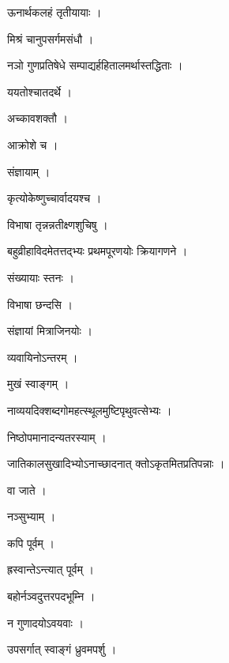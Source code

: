 \documentclass[10pt, openany]{book}
\begin{document}
\noindent ऊनार्थकलहं तृतीयायाः ।

\noindent मिश्रं चानुपसर्गमसंधौ ।

\noindent नञो गुणप्रतिषेधे सम्पाद्यर्हहितालमर्थास्तद्धिताः ।

\noindent ययतोश्चातदर्थे ।

\noindent अच्कावशक्तौ ।

\noindent आक्रोशे च ।

\noindent संज्ञायाम् ।

\noindent कृत्योकेष्णुच्चार्वादयश्च ।

\noindent विभाषा तृन्नन्नतीक्ष्णशुचिषु ।

\noindent बहुव्रीहाविदमेतत्तद्भ्यः प्रथमपूरणयोः क्रियागणने ।

\noindent संख्यायाः स्तनः ।

\noindent विभाषा छन्दसि ।

\noindent संज्ञायां मित्राजिनयोः ।

\noindent व्यवायिनोऽन्तरम् ।

\noindent मुखं स्वाङ्गम् ।

\noindent नाव्ययदिक्शब्दगोमहत्स्थूलमुष्टिपृथुवत्सेभ्यः ।

\noindent निष्ठोपमानादन्यतरस्याम् ।

\noindent जातिकालसुखादिभ्योऽनाच्छादनात् क्तोऽकृतमितप्रतिपन्नाः ।

\noindent वा जाते ।

\noindent नञ्सुभ्याम् ।

\noindent कपि पूर्वम् ।

\noindent ह्रस्वान्तेऽन्त्यात् पूर्वम् ।

\noindent बहोर्नञ्वदुत्तरपदभूम्नि ।

\noindent न गुणादयोऽवयवाः ।

\noindent उपसर्गात् स्वाङ्गं ध्रुवमपर्शु ।
\end{document}
